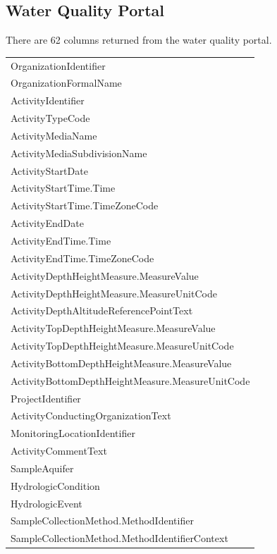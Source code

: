 \documentclass[a4paper,11pt]{article}
\begin{document}
\subsection{Water Quality Portal}
There are 62 columns returned from the water quality portal. 

\begin{tabular}{l}
  \hline
  \hline
OrganizationIdentifier \\ 
  OrganizationFormalName \\ 
  ActivityIdentifier \\ 
  ActivityTypeCode \\ 
  ActivityMediaName \\ 
  ActivityMediaSubdivisionName \\ 
  ActivityStartDate \\ 
  ActivityStartTime.Time \\ 
  ActivityStartTime.TimeZoneCode \\ 
  ActivityEndDate \\ 
  ActivityEndTime.Time \\ 
  ActivityEndTime.TimeZoneCode \\ 
  ActivityDepthHeightMeasure.MeasureValue \\ 
  ActivityDepthHeightMeasure.MeasureUnitCode \\ 
  ActivityDepthAltitudeReferencePointText \\ 
  ActivityTopDepthHeightMeasure.MeasureValue \\ 
  ActivityTopDepthHeightMeasure.MeasureUnitCode \\ 
  ActivityBottomDepthHeightMeasure.MeasureValue \\ 
  ActivityBottomDepthHeightMeasure.MeasureUnitCode \\ 
  ProjectIdentifier \\ 
  ActivityConductingOrganizationText \\ 
  MonitoringLocationIdentifier \\ 
  ActivityCommentText \\ 
  SampleAquifer \\ 
  HydrologicCondition \\ 
  HydrologicEvent \\ 
  SampleCollectionMethod.MethodIdentifier \\ 
  SampleCollectionMethod.MethodIdentifierContext \\ 

\end{tabular}
\end{document}
